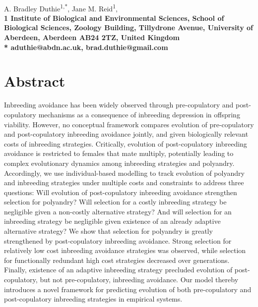 \documentclass[10pt,letterpaper]{article}
\begin{document}
\vspace*{0.35in}

\begin{flushleft}
{\LARGE
\textbf{}
}
\newline
\\
A. Bradley Duthie\textsuperscript{1,*},
Jane M. Reid\textsuperscript{1},
\\
\bigskip
\bf{1} Institute of Biological and Environmental Sciences, School of Biological Sciences, Zoology Building, Tillydrone Avenue, University of Aberdeen, Aberdeen AB24 2TZ, United Kingdom
\\
\bigskip
*  aduthie@abdn.ac.uk, brad.duthie@gmail.com

\end{flushleft}

\section*{Abstract}
Inbreeding avoidance has been widely observed through pre-copulatory and post-copulatory mechanisms as a consequence of inbreeding depression in offspring viability. However, no conceptual framework compares evolution of pre-copulatory and post-copulatory inbreeding avoidance jointly, and given biologically relevant costs of inbreeding strategies. Critically, evolution of post-copulatory inbreeding avoidance is restricted to females that mate multiply, potentially leading to complex evolutionary dynamics among inbreeding strategies and polyandry. Accordingly, we use individual-based modelling to track evolution of polyandry and inbreeding strategies under multiple costs and constraints to address three questions: Will evolution of post-copulatory inbreeding avoidance strengthen selection for polyandry? Will selection for a costly inbreeding strategy be negligible given a non-costly alternative strategy? And will selection for an inbreeding strategy be negligible given existence of an already adaptive alternative strategy? We show that selection for polyandry is greatly strengthened by post-copulatory inbreeding avoidance. Strong selection for relatively low cost inbreeding avoidance strategies was observed, while selection for functionally redundant high cost strategies decreased over generations. Finally, existence of an adaptive inbreeding strategy precluded evolution of post-copulatory, but not pre-copulatory, inbreeding avoidance. Our model thereby introduces a novel framework for predicting evolution of both pre-copulatory and post-copulatory inbreeding strategies in empirical systems.
\end{document}
